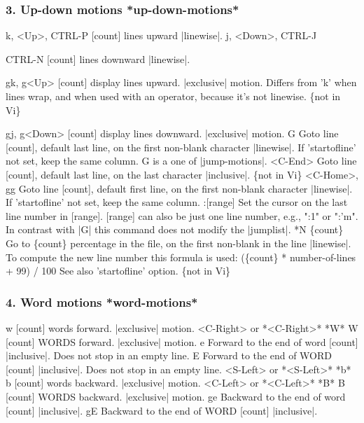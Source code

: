 \documentclass{beamer}
\begin{document}
\begin{frame}
  \frametitle{3. Up-down motions                    *up-down-motions*}
  k, <Up>, CTRL-P           [count] lines upward |linewise|.
  j, <Down>, CTRL-J

  CTRL-N            [count] lines downward |linewise|.

  gk, g<Up>         [count] display lines upward.  |exclusive| motion.
  Differs from 'k' when lines wrap, and when used with
  an operator, because it's not linewise.  \{not in Vi\}

  gj, g<Down>           [count] display lines downward.  |exclusive| motion.
  G         Goto line [count], default last line, on the first
  non-blank character |linewise|.  If 'startofline' not
  set, keep the same column.
  G is a one of |jump-motions|.
  <C-End>           Goto line [count], default last line, on the last character |inclusive|. \{not in Vi\}
  <C-Home>, gg          Goto line [count], default first line, on the first non-blank character |linewise|.  If 'startofline' not set, keep the same column.
  :[range]      Set the cursor on the last line number in [range].
  [range] can also be just one line number, e.g., ":1"
  or ":'m".
  In contrast with |G| this command does not modify the
  |jumplist|.
  *N%
  \{count\}     Go to \{count\} percentage in the file, on the first
  non-blank in the line |linewise|.  To compute the new
  line number this formula is used:
  (\{count\} * number-of-lines + 99) / 100
  See also 'startofline' option.  \{not in Vi\}
\end{frame}

\begin{frame}
  \frametitle{4. Word motions                       *word-motions*}
  w         [count] words forward.  |exclusive| motion.
  <C-Right> or                  *<C-Right>* *W*
  W         [count] WORDS forward.  |exclusive| motion.
  e         Forward to the end of word [count] |inclusive|.
  Does not stop in an empty line.
  E         Forward to the end of WORD [count] |inclusive|.
  Does not stop in an empty line.
  <S-Left>  or                  *<S-Left>* *b*
  b         [count] words backward.  |exclusive| motion.
  <C-Left>  or                  *<C-Left>* *B*
  B         [count] WORDS backward.  |exclusive| motion.
  ge            Backward to the end of word [count] |inclusive|.
  gE            Backward to the end of WORD [count] |inclusive|.
\end{frame}
\end{document}
